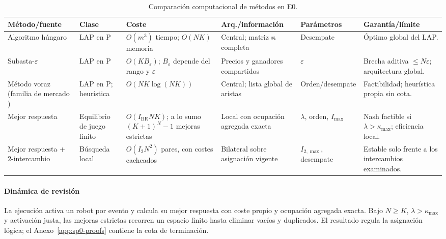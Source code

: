 \begin{table}[!htbp]
 \centering
 \caption{Comparación computacional de métodos en E0.}
 \label{tab:sp0-method-literature}
 \scriptsize
 \setlength{\tabcolsep}{1.5pt}
 \renewcommand{\arraystretch}{1.04}
 \begin{tabularx}{\textwidth}{>{\raggedright\arraybackslash}p{2.25cm} >{\raggedright\arraybackslash}p{1.45cm} >{\raggedright\arraybackslash}p{2.25cm} >{\raggedright\arraybackslash}p{2.15cm} >{\raggedright\arraybackslash}p{1.55cm} Y}
  \toprule
  Método/fuente & Clase & Coste & Arq./información & Parámetros & Garantía/límite \\
  \midrule
  Algoritmo húngaro \parencite{kuhn1955Hungarian} & LAP en P & $O(m^3)$ tiempo; $O(NK)$ memoria & Central; matriz $\boldsymbol\kappa$ completa & Desempate & Óptimo global del LAP. \\
  Subasta-$\varepsilon$ \parencite{bertsekas1988Auction} & LAP en P & $O(KB_\varepsilon)$; $B_\varepsilon$ depende del rango y $\varepsilon$ & Precios y ganadores compartidos & $\varepsilon$ & Brecha aditiva \(\leq N\varepsilon\); arquitectura global. \\
  Método voraz (familia de mercado \parencite{gerkeyMataric2002MURDOCH}) & LAP en P; heurística & $O(NK\log(NK))$ & Central; lista global de aristas & Orden/desempate & Factibilidad; heurística propia sin cota. \\
  Mejor respuesta \parencite{monderer1996potential} & Equilibrio de juego finito & $O(I_{\mathrm{BR}}NK)$; a lo sumo $(K+1)^N-1$ mejoras estrictas & Local con ocupación agregada exacta & $\lambda$, orden, $I_{\max}$ & Nash factible si \(\lambda>\kappa_{\max}\); eficiencia local. \\
  Mejor respuesta + 2-intercambio & Búsqueda local & $O(I_2N^2)$ pares, con costes cacheados & Bilateral sobre asignación vigente & $I_{2,\max}$, desempate & Estable solo frente a los intercambios examinados. \\
  \bottomrule
 \end{tabularx}
 \viuownsource
\end{table}

\paragraph{Dinámica de revisión}

La ejecución activa un robot por evento y calcula su mejor respuesta con coste propio y ocupación agregada exacta. Bajo \(N\geq K\), \(\lambda>\kappa_{\max}\) y activación justa, las mejoras estrictas recorren un espacio finito hasta eliminar vacíos y duplicados. El resultado regula la asignación lógica; el Anexo~\ref{app:sp0-proofs} contiene la cota de terminación.

